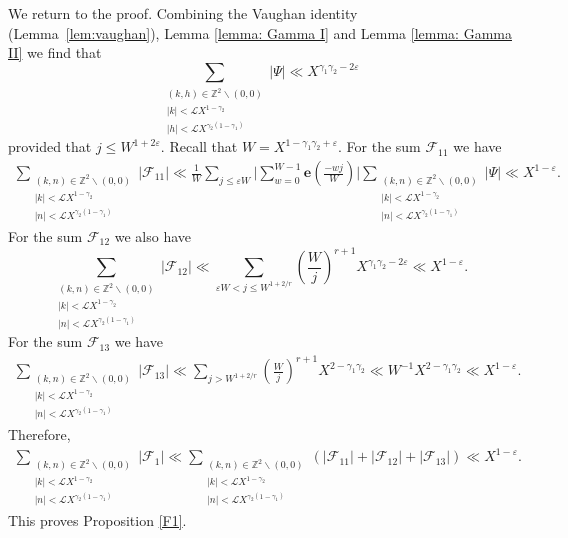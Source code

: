 \documentclass[12pt, reqno, twoside, letterpaper]{amsart}
\numberwithin{equation}{section}
\newcommand{\cF}{\ensuremath{\mathcal{F}}}
\newcommand{\cL}{\ensuremath{\mathcal{L}}}
\newcommand{\ZZ}{\ensuremath{\mathbb{Z}}}
\theoremstyle{customthm}
\theoremstyle{customrem}
\begin{document}
We return to the proof. Combining the Vaughan identity (Lemma~\ref{lem:vaughan}), Lemma \ref{lemma: Gamma I}
and Lemma \ref{lemma: Gamma II} we find that
$$
\sum_{\substack{(k,h) \in \ZZ^2 \backslash (0,0) \\ |k|<\cL X^{1-\gamma_2} \\ |h|<\cL X^{\gamma_2(1-\gamma_1)}}}
|\Psi|\ll X^{\gamma_1\gamma_2-2\varepsilon}
$$
provided that $j\leqslant W^{1+2\varepsilon}$.
Recall that $W=X^{1-\gamma_1\gamma_2+\varepsilon}$. For the sum $\cF_{11}$ we have
\begin{align*}
	\sum_{\substack{(k,n) \in \ZZ^2 \backslash (0,0) \\ |k|<\cL X^{1-\gamma_2} \\ |n|<\cL X^{\gamma_2(1-\gamma_1)}}}|\cF_{11}|
	\ll\frac{1}{W}\sum_{j\leqslant \varepsilon W}\Bigg|
	\sum_{w=0}^{W-1}\mathbf{e}\left(\frac{-wj}{W}\right)\Bigg|
	\sum_{\substack{(k,n) \in \ZZ^2 \backslash (0,0) \\ |k|<\cL X^{1-\gamma_2} \\ |n|<\cL X^{\gamma_2(1-\gamma_1)}}}|\Psi|\ll X^{1-\varepsilon}.
\end{align*}
For the sum $\cF_{12}$ we also have
$$
\sum_{\substack{(k,n) \in \ZZ^2 \backslash (0,0) \\ |k|<\cL X^{1-\gamma_2} \\ |n|<\cL X^{\gamma_2(1-\gamma_1)}}}|\cF_{12}|\ll
\sum_{\varepsilon W<j\leqslant W^{1+2/r}}
\left(\frac{W}{j}\right)^{r+1}
X^{\gamma_1\gamma_2-2\varepsilon}\ll X^{1-\varepsilon}.
$$
For the sum $\cF_{13}$ we have
\begin{align*}
	\sum_{\substack{(k,n) \in \ZZ^2 \backslash (0,0) \\ |k|<\cL X^{1-\gamma_2} \\ |n|<\cL X^{\gamma_2(1-\gamma_1)}}}|\cF_{13}|
	\ll \sum_{j>W^{1+2/r}}\left(\frac{W}{j}\right)^{r+1}X^{2-\gamma_1\gamma_2}
	\ll W^{-1}X^{2-\gamma_1\gamma_2}\ll X^{1-\varepsilon}.
\end{align*}
Therefore,
\begin{align}\label{eq: bound for F1}
	\sum_{\substack{(k,n) \in \ZZ^2 \backslash (0,0) \\ |k|<\cL X^{1-\gamma_2} \\ |n|<\cL X^{\gamma_2(1-\gamma_1)}}}|\cF_{1}|
	\ll \sum_{\substack{(k,n) \in \ZZ^2 \backslash (0,0) \\ |k|<\cL X^{1-\gamma_2} \\ |n|<\cL X^{\gamma_2(1-\gamma_1)}}}\left(|\cF_{11}|+|\cF_{12}|+|\cF_{13}|\right)
	\ll X^{1-\varepsilon}.
\end{align}
This proves Proposition \ref{F1}.
\end{document}

